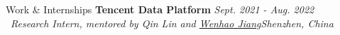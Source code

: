 \begin{rSection}{Work \& Internships}
    \textbf{Tencent Data Platform} \hfill \textit{Sept. 2021 - Aug. 2022}\\
    ~\textit{Research Intern, mentored by Qin Lin and \href{https://scholar.google.com/citations?user=rAlT64IAAAAJ}{Wenhao Jiang}\hfill Shenzhen, China}
\end{rSection}



